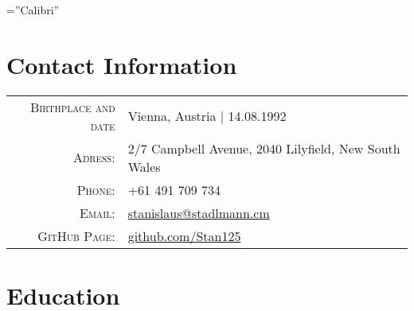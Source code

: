 \documentclass[a4paper,10pt]{article} %
\begin{document}
\pagestyle{empty} %

\font\fb=''Calibri'' %


\par{\bigskip\par} %

\section{Contact Information}

\begin{tabular}{rl}
\textsc{Birthplace and date} & Vienna, Austria  | 14.08.1992 \\
\textsc{Adress:} & 2/7 Campbell Avenue, 2040 Lilyfield, New South Wales \\
\textsc{Phone:} & +61 491 709 734\\
\textsc{Email:} & \href{mailto:stanislaus@stadlmann.cm}{stanislaus@stadlmann.cm} \\
\textsc{GitHub Page:} & \href{https://github.com/Stan125}{github.com/Stan125}
\end{tabular}


\section{Education}

\end{document}
